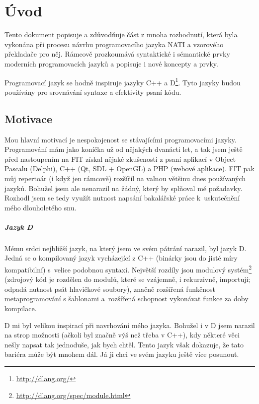 
\chapter{Úvod}
Tento dokument popisuje a zdůvodňuje část z mnoha rozhodnutí, která byla vykonána při procesu návrhu programovacího jazyka NATI a vzorového překladače pro něj. Rámcově prozkoumává syntaktické i sémantické prvky moderních programovacích jazyků a popisuje i nové koncepty a prvky.

Programovací jazyk se hodně inspiruje jazyky C++ a D\footnote{\url{http://dlang.org/}}. Tyto jazyky budou používány pro srovnávání syntaxe a efektivity psaní kódu.

\section{Motivace}
Mou hlavní motivací je nespokojenost se stávajícími programovacími jazyky. Programování mám jako koníčka už od nějakých dvanácti let, a tak jsem ještě před nastoupením na FIT získal nějaké zkušenosti z psaní aplikací v Object Pascalu (Delphi), C++ (Qt, SDL + OpenGL) a PHP (webové aplikace). FIT pak můj repertoár (i když jen rámcově) rozšířil na valnou většinu dnes používaných jazyků. Bohužel jsem ale nenarazil na žádný, který by splňoval mé požadavky. Rozhodl jsem se tedy využít nutnost napsání bakalářské práce k~uskutečnění mého dlouholetého snu.

\paragraph{Jazyk D}
Mému srdci nejbližší jazyk, na který jsem ve svém pátrání narazil, byl jazyk D. Jedná se o kompilovaný jazyk vycházející z C++ (binárky jsou do jisté míry kompatibilní) s~velice podobnou syntaxí. Největší rozdíly jsou modulový systém\footnote{\url{http://dlang.org/spec/module.html}} (zdrojový kód je rozdělen do modulů, které se vzájemně, i rekurzivně, importují; odpadá nutnost psát hlavičkové soubory), značně rozšířená funkčnost metaprogramování s šablonami a~rozšířená schopnost vykonávat funkce za doby kompilace.

D mi byl velikou inspirací při navrhování mého jazyka. Bohužel i v D jsem narazil na strop možnosti (ačkoli byl značně výš než třeba v C++), kdy některé věci nešly napsat tak jednoduše, jak bych chtěl. Tento jazyk však dokazuje, že tato bariéra může být mnohem dál. Já ji chci ve svém jazyku ještě více posunout. 

